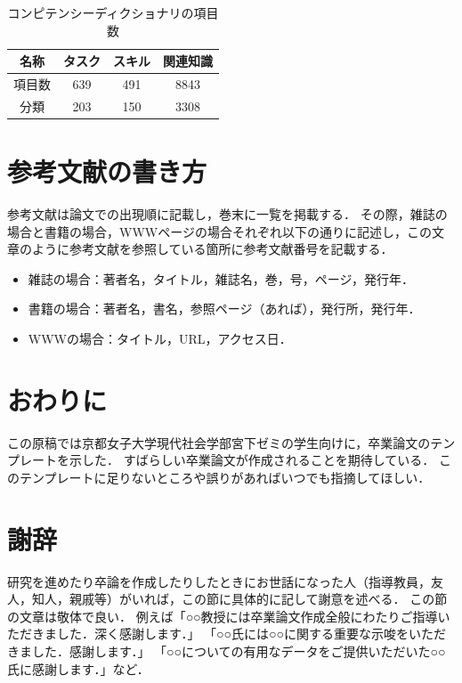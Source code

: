 \documentclass[a4paper,twocolumn,10pt]{ltjsarticle}
\begin{document}
\begin{table}[htb]
 \begin{center}
  \caption{コンピテンシーディクショナリの項目数}
  \label{tab:competency}
  \begin{tabular}{cccc}
   \hline
   名称 & タスク & スキル & 関連知識\\
   \hline
   項目数 & 639 & 491 & 8843\\
   分類 & 203 & 150 & 3308\\
   \hline
  \end{tabular}
 \end{center}
\end{table}

\section{参考文献の書き方}

参考文献は論文での出現順に記載し，巻末に一覧を掲載する．
その際，雑誌の場合\cite{newsweek,refjournal1,refjournal2}と書籍の場合\cite{refbook1,refbook2}，WWWページの場合\cite{refwww,readme}それぞれ以下の通りに記述し，この文章のように参考文献を参照している箇所に参考文献番号を記載する．

\begin{itemize}
 \item 雑誌の場合：著者名，タイトル，雑誌名，巻，号，ページ，発行年．
 \item 書籍の場合：著者名，書名，参照ページ（あれば），発行所，発行年．
 \item WWWの場合：タイトル，URL，アクセス日．
\end{itemize}

\section{おわりに}

この原稿では京都女子大学現代社会学部宮下ゼミの学生向けに，卒業論文のテンプレートを示した．
すばらしい卒業論文が作成されることを期待している．
このテンプレートに足りないところや誤りがあればいつでも指摘してほしい．

\section*{謝辞}

研究を進めたり卒論を作成したりしたときにお世話になった人（指導教員，友人，知人，親戚等）がいれば，この節に具体的に記して謝意を述べる．
この節の文章は敬体で良い．
例えば「○○教授には卒業論文作成全般にわたりご指導いただきました．深く感謝します．」
「○○氏には○○に関する重要な示唆をいただきました．感謝します．」
「○○についての有用なデータをご提供いただいた○○氏に感謝します．」など．
\end{document}
